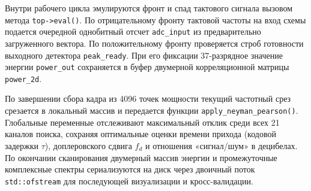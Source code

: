 Внутри рабочего цикла эмулируются фронт и спад тактового сигнала вызовом метода \texttt{top->eval()}. По отрицательному фронту тактовой частоты на вход схемы подается очередной однобитный отсчет \texttt{adc\_input} из предварительно загруженного вектора. По положительному фронту проверяется строб готовности выходного детектора \texttt{peak\_ready}. При его фиксации 37-разрядное значение энергии \texttt{power\_out} сохраняется в буфер двумерной корреляционной матрицы \texttt{power\_2d}. 

По завершении сбора кадра из 4096 точек мощности текущий частотный срез срезается в локальный массив и передается функции \texttt{apply\_neyman\_pearson()}. Глобальные переменные отслеживают максимальный отклик среди всех 21 каналов поиска, сохраняя оптимальные оценки времени прихода (кодовой задержки $\tau$), доплеровского сдвига $f_d$ и отношения «сигнал/шум» в децибелах. По окончании сканирования двумерный массив энергии и промежуточные комплексные спектры сериализуются на диск через двоичный поток \texttt{std::ofstream} для последующей визуализации и кросс-валидации.
